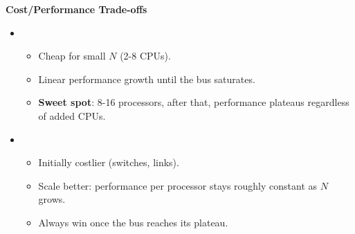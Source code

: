 \highspace
\begin{flushleft}
    \textcolor{Red2}{ \textbf{Cost/Performance Trade-offs}}
\end{flushleft}
\begin{itemize}
    \item {}
    \begin{itemize}
        \item Cheap for small $N$ (2-8 CPUs).
        \item Linear performance growth until the bus saturates.
        \item \textbf{Sweet spot}: 8-16 processors, after that, performance plateaus regardless of added CPUs.
    \end{itemize}
    \item {}
    \begin{itemize}
        \item Initially costlier (switches, links).
        \item Scale better: performance per processor stays roughly constant as $N$ grows.
        \item Always win once the bus reaches its plateau.
    \end{itemize}
\end{itemize}